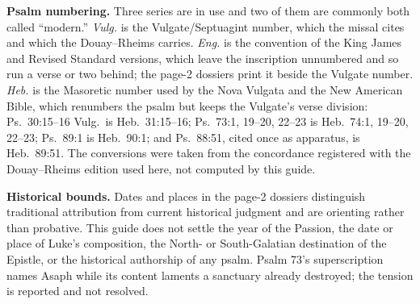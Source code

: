 \textbf{Psalm numbering.} Three series are in use and two of them are commonly
both called ``modern.'' \textit{Vulg.} is the Vulgate/Septuagint number, which
the missal cites and which the Douay--Rheims carries. \textit{Eng.} is the
convention of the King James and Revised Standard versions, which leave the
inscription unnumbered and so run a verse or two behind; the page-2 dossiers
print it beside the Vulgate number. \textit{Heb.} is the Masoretic number used
by the Nova Vulgata and the New American Bible, which renumbers the psalm but
keeps the Vulgate's verse division: Ps.~30:15--16 Vulg.\ is Heb.\ 31:15--16;
Ps.~73:1, 19--20, 22--23 is Heb.\ 74:1, 19--20, 22--23; Ps.~89:1 is Heb.\ 90:1;
and Ps.~88:51, cited once as apparatus, is Heb.\ 89:51. The conversions were
taken from the concordance registered with the Douay--Rheims edition used
here, not computed by this guide.

\textbf{Historical bounds.} Dates and places in the page-2 dossiers
distinguish traditional attribution from current historical judgment and are
orienting rather than probative. This guide does not settle the year of the
Passion, the date or place of Luke's composition, the North- or South-Galatian
destination of the Epistle, or the historical authorship of any psalm. Psalm
73's superscription names Asaph while its content laments a sanctuary already
destroyed; the tension is reported and not resolved.

